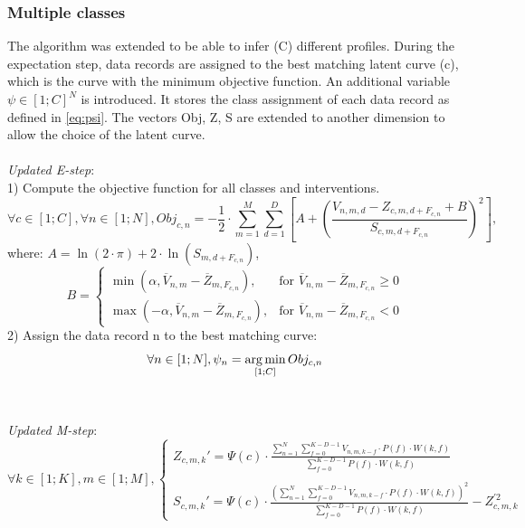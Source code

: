 \subsubsection{Multiple classes} \label{sec:multiclass}
The algorithm was extended to be able to infer (C) different profiles. During the expectation step, data records are assigned to the best matching latent curve (c), which is the curve with the minimum objective function. An additional variable $\psi \in [1; C]^N$ is introduced. It stores the class assignment of each data record as defined in \ref{eq:psi}. The vectors Obj, Z, S are extended to another dimension to allow the choice of the latent curve.\\\\
\textit{Updated E-step}: \\
1) Compute the objective function for all classes and interventions.
\begin{equation}\label{eq:multiobj}
    \forall c \in [1;C], \forall n \in [1;N], Obj_{c,n} = -\frac{1}{2} \cdot \sum_{m=1}^M \sum_{d=1}^D \left[ A + \left( \frac{V_{n,m,d} - Z_{c,m,d+F_{c,n}} + B }{ S_{c,m,d+F_{c,n}} } \right)^2 \right],
\end{equation} 
where: $ A = \ln(2\cdot \pi) + 2\cdot \ln( S_{m,d+F_{c,n}} )$,
\begin{equation}
    B = 
    \begin{cases}
        \min (\alpha, \overline{V}_{n,m} - \overline{Z}_{m,F_{c,n}} ), & \text{for } \overline{V}_{n,m} - \overline{Z}_{m,F_{c,n}} \geq 0\\
        \max (-\alpha, \overline{V}_{n,m} - \overline{Z}_{m,F_{c,n}} ), & \text{for } \overline{V}_{n,m} - \overline{Z}_{m,F_{c,n}} < 0
    \end{cases}
\end{equation}
2) Assign the data record n to the best matching curve:
\begin{equation} \label{eq:psi}
    \forall n \in [1;N], \psi_n = \operatorname*{arg\,min}_{[1;C]}Obj_{c,n}
\end{equation} \\\\
\textit{Updated M-step}:
\begin{equation}
    \forall k \in [1;K], m \in [1;M],
    \begin{cases}
        Z_{c,m,k}' = \Psi(c)\cdot \frac{ \sum_{n=1}^N \sum_{f=0}^{K-D-1} V_{n,m,k-f} \cdot P(f) \cdot W(k,f) }{ \sum_{f=0}^{K-D-1} P(f)\cdot W(k,f) }\\\\
        S_{c,m,k}' = \Psi(c)\cdot \frac{\left( \sum_{n=1}^N \sum_{f=0}^{K-D-1} V_{n,m,k-f} \cdot P(f) \cdot W(k,f) \right)^2}{ \sum_{f=0}^{K-D-1} P(f)\cdot W(k,f) } - Z_{c,m,k}^{'2}
    \end{cases}
\end{equation}

